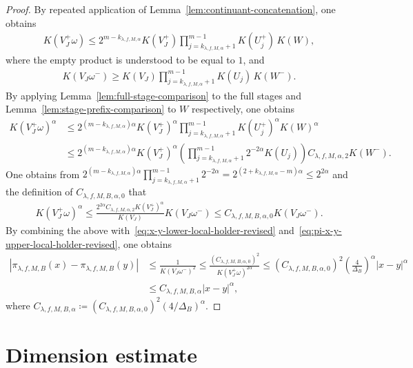 \documentclass[10pt,a4paper]{amsart}
\begin{document}
\begin{proof}
By repeated application of Lemma~\ref{lem:continuant-concatenation}, one obtains
\begin{align*}
    K(V^+_J\omega)
    \leq
    2^{m-k_{\lambda,f,M,\alpha}}
    K(V^+_J)
    \prod_{j=k_{\lambda,f,M,\alpha}+1}^{m-1}K(U^+_j)\,K(W),
\end{align*}
where the empty product is understood to be equal to $1$, and
\begin{align*}
    K(V_J\omega^-)
    \geq
    K(V_J)
    \prod_{j=k_{\lambda,f,M,\alpha}+1}^{m-1}K(U_j)\,K(W^-).
\end{align*}
By applying Lemma~\ref{lem:full-stage-comparison} to the full stages and Lemma~\ref{lem:stage-prefix-comparison} to $W$ respectively, one obtains
\begin{align*}
    K(V^+_J\omega)^\alpha
    &\leq
    2^{(m-k_{\lambda,f,M,\alpha})\alpha}
    K(V^+_J)^\alpha
    \prod_{j=k_{\lambda,f,M,\alpha}+1}^{m-1}K(U^+_j)^\alpha
    K(W)^\alpha \\
    &\leq
    2^{(m-k_{\lambda,f,M,\alpha})\alpha}
    K(V^+_J)^\alpha
    \left(\prod_{j=k_{\lambda,f,M,\alpha}+1}^{m-1}2^{-2\alpha}K(U_j)\right)
    C_{\lambda,f,M,\alpha,2}K(W^-).
\end{align*}
One obtains from $2^{(m-k_{\lambda,f,M,\alpha})\alpha}\prod_{j=k_{\lambda,f,M,\alpha}+1}^{m-1}2^{-2\alpha}=2^{(2+k_{\lambda,f,M,\alpha}-m)\alpha}\leq 2^{2\alpha}$ and the definition of $C_{\lambda,f,M,B,\alpha,0}$ that
\begin{align*}
    K(V^+_J\omega)^\alpha
    \leq
    \frac{2^{2\alpha}C_{\lambda,f,M,\alpha,2}K(V^+_J)^\alpha}{K(V_J)}
    K(V_J\omega^-)
    \leq
    C_{\lambda,f,M,B,\alpha,0}K(V_J\omega^-).
\end{align*}
By combining the above with~\eqref{eq:x-y-lower-local-holder-revised} and~\eqref{eq:pi-x-y-upper-local-holder-revised}, one obtains
\begin{align*}
    \left|\pi_{\lambda,f,M,B}(x)-\pi_{\lambda,f,M,B}(y)\right|
    &\leq \frac{1}{K(V_J\omega^-)^2} 
    \leq \frac{(C_{\lambda,f,M,B,\alpha,0})^2}{K(V^+_J\omega)^{2\alpha}}
    \leq (C_{\lambda,f,M,B,\alpha,0})^2\left(\frac{4}{\Delta_B}\right)^\alpha \left|x-y\right|^\alpha \\
    &\leq C_{\lambda,f,M,B,\alpha}\left|x-y\right|^\alpha,
\end{align*}
where $C_{\lambda,f,M,B,\alpha}\coloneqq (C_{\lambda,f,M,B,\alpha,0})^2({4}/{\Delta_B})^\alpha$.
\end{proof}

\section{Dimension estimate}
\end{document}
